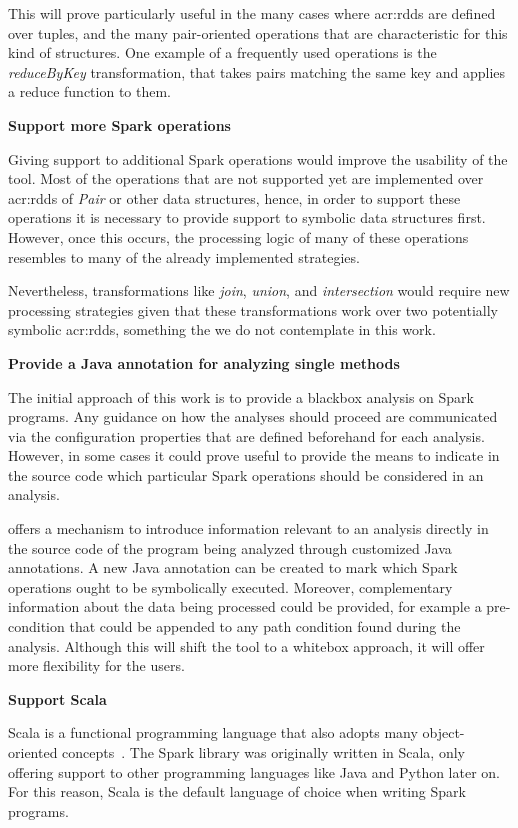 This will prove particularly useful in the many cases where \acrshort{acr:rdd}s are defined over tuples, and the many pair-oriented operations that are characteristic for this kind of structures. One example of a frequently used operations is the \textit{reduceByKey} transformation, that takes pairs matching the same key and applies a reduce function to them.

\textbf{Support more Spark operations}

Giving support to additional Spark operations would improve the usability of the tool. Most of the operations that are not supported yet are implemented over \acrshort{acr:rdd}s of \textit{Pair} or other data structures, hence, in order to support these operations it is necessary to provide support to symbolic data structures first. However, once this occurs, the processing logic of many of these operations resembles to many of the already implemented strategies.

Nevertheless, transformations like \textit{join}, \textit{union}, and \textit{intersection} would require new processing strategies given that these transformations work over two potentially symbolic \acrshort{acr:rdd}s, something the we do not contemplate in this work.

\textbf{Provide a Java annotation for analyzing single methods}

The initial approach of this work is to provide a blackbox analysis on Spark programs. Any guidance on how the analyses should proceed are communicated via the configuration properties that are defined beforehand for each analysis. However, in some cases it could prove useful to provide the means to indicate in the source code which particular Spark operations should be considered in an analysis.

\jpf{} offers a mechanism to introduce information relevant to an analysis directly in the source code of the program being analyzed through customized Java annotations. A new Java annotation can be created to mark which Spark operations ought to be symbolically executed. Moreover, complementary information about the data being processed could be provided, for example a pre-condition that could be appended to any path condition found during the analysis. Although this will shift the tool to a whitebox approach, it will offer more flexibility for the users. 

\textbf{Support Scala}

Scala is a functional programming language that also adopts many object-oriented concepts~\cite{WebScala2017}. The Spark library was originally written in Scala, only offering support to other programming languages like Java and Python later on. For this reason, Scala is the default language of choice when writing Spark programs. 

